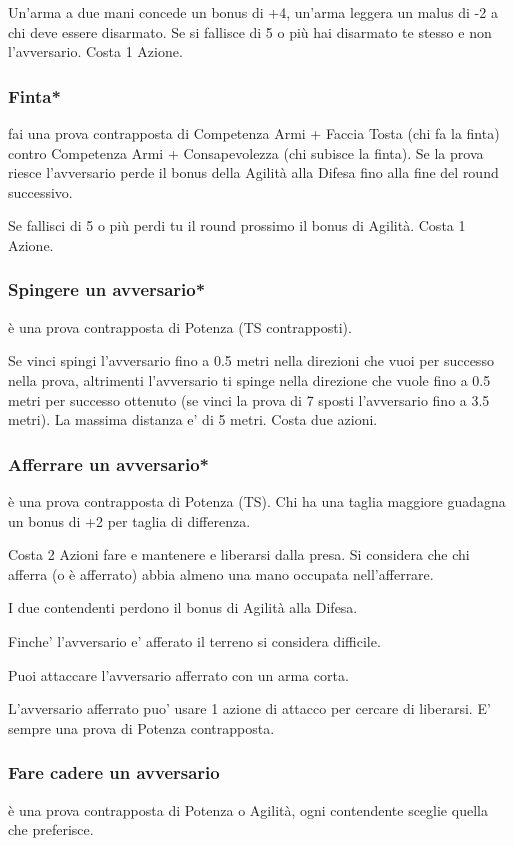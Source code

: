\documentclass[a4paper,11pt,twoside,openany]{book}
\begin{document}
Un'arma a due mani concede un bonus di +4, un'arma leggera un malus di -2 a chi deve essere disarmato. Se si fallisce di 5 o più hai disarmato te stesso e non l'avversario. Costa 1 Azione.

\subsubsection{Finta*} fai una prova contrapposta di Competenza Armi + Faccia Tosta (chi fa la finta) contro Competenza Armi + Consapevolezza (chi subisce la finta). Se la prova riesce l'avversario perde il bonus della Agilità alla Difesa fino alla fine del round successivo.

Se fallisci di 5 o più perdi tu il round prossimo il bonus di Agilità.
Costa 1 Azione.

\subsubsection{Spingere un avversario*} è una prova contrapposta di Potenza (TS contrapposti).

Se vinci spingi l'avversario fino a 0.5 metri nella direzioni che vuoi per successo nella prova, altrimenti l'avversario ti spinge nella direzione che vuole fino a 0.5 metri per successo ottenuto (se vinci la prova di 7 sposti l'avversario fino a 3.5 metri). La massima distanza e' di 5 metri.
Costa due azioni.

\subsubsection{Afferrare un avversario*} è una prova contrapposta di Potenza (TS). Chi ha una taglia maggiore guadagna un bonus di +2 per taglia di differenza.

Costa 2 Azioni fare e mantenere e liberarsi dalla presa. Si considera che chi afferra (o è afferrato) abbia almeno una mano occupata nell'afferrare.

I due contendenti perdono il bonus di Agilità alla Difesa.

Finche' l'avversario e' afferato il terreno si considera difficile.

Puoi attaccare l'avversario afferrato con un arma corta.

L'avversario afferrato puo' usare 1 azione di attacco per cercare di liberarsi. E' sempre una prova di Potenza contrapposta.

\subsubsection{Fare cadere un avversario} è una prova contrapposta di Potenza o Agilità, ogni contendente sceglie quella che preferisce.
\end{document}
